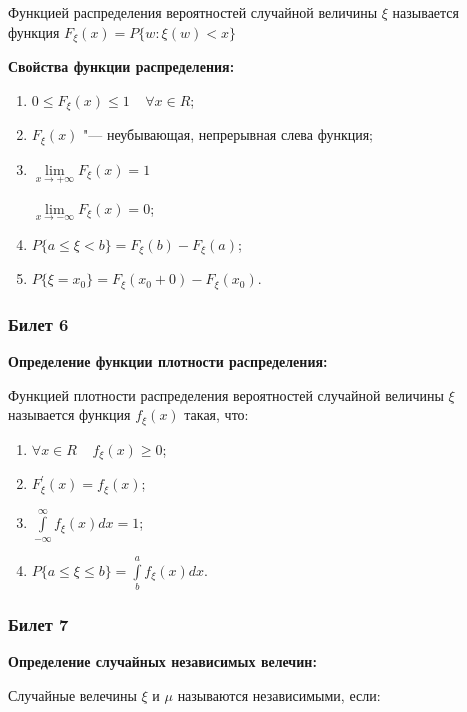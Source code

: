    Функцией распределения вероятностей 
    случайной величины $\xi$ называется функция 
    $F_{\xi}(x) = P\{w : \xi (w) < x\}$
    \bigskip

\textbf{Свойства функции распределения:}
    \smallskip
    
    \begin{enumerate}
        \item{$0 \leq F_{\xi}(x) \leq 1 \;\;\;\;
        \forall x \in R$;}
        \item{$F_{\xi}(x)$ "--- неубывающая,
        непрерывная слева функция;}
        \item{$\lim\limits_{x \to +\infty} F_{\xi} (x) = 1$
        
        $\lim\limits_{x \to -\infty} F_{\xi} (x) = 0$;}
        \item{$P\{a \leq \xi < b\} = F_{\xi}(b) -
        F_{\xi}(a)$;}
        \item{$P\{\xi = x_0\} = F_{\xi}(x_0 + 0)
        - F_{\xi}(x_0)$.}
    \end{enumerate}
    \bigskip

\subsubsection{Билет 6}

\textbf{Определение функции плотности
распределения:}
    \smallskip

    Функцией плотности распределения вероятностей
    случайной величины $\xi$ называется функция
    $f_{\xi}(x)$ такая, что:

    \begin{enumerate}
        \item{$\forall x \in R \;\;\;\; f_{\xi}
        (x) \geq 0$;}
        \item{$F_{\xi}^{'}(x) = f_{\xi}(x)$;}
        \item{$\int\limits_{-\infty}^{\infty} f_{\xi}(x)
        dx = 1$;}
        \item{$P\{a \leq \xi \leq b\} = \int\limits_b^{a}
        f_{\xi}(x) dx$.}
    \end{enumerate}
    \bigskip

\subsubsection{Билет 7}

\textbf{Определение случайных независимых
велечин:}
    \smallskip

    Случайные велечины $\xi$ и $\mu$ называются
    независимыми, если:


